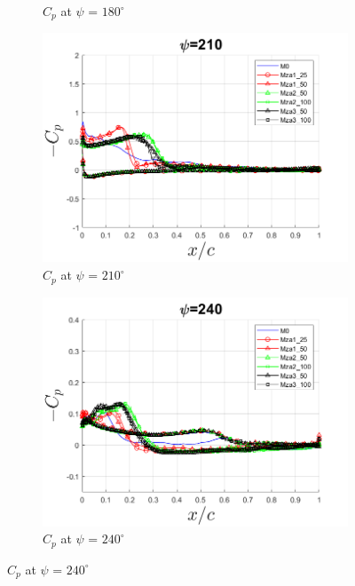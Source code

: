 \begin{figure}[H]
\begin{subfigure}[b]{0.475\textwidth}
\caption{ $C_p$ at $\psi$ = $180^\circ$}
\label{fig:zonal_Cp_180}
\end{subfigure}
\begin{subfigure}[b]{0.475\textwidth}
\centering
\includegraphics[width=1\textwidth]{figures/zonal_adapt_results/Cp/phase_210.png}
\caption{ $C_p$ at $\psi$ = $210^\circ$}
\label{fig:zonal_Cp_210}
\end{subfigure}
\begin{subfigure}[b]{0.475\textwidth}
\centering
\includegraphics[width=1\textwidth]{figures/zonal_adapt_results/Cp/phase_240.png}
\caption{ $C_p$ at $\psi$ = $240^\circ$}
\label{fig:zonal_Cp_240}
\label{fig:zonal_Cp_plots_LEV}
\end{subfigure}
\end{figure}



